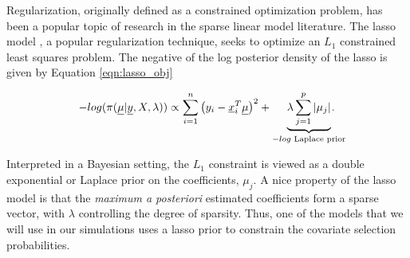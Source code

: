 		Regularization, originally defined as a constrained optimization problem, has been a popular topic of research in the sparse linear model literature. The lasso model \cite{tibshirani1996regression}, a popular regularization technique, seeks to optimize an $L_1$ constrained least squares problem. The negative of the log posterior density of the lasso is given by Equation \ref{eqn:lasso_obj}
		
		\begin{equation}\label{eqn:lasso_obj}
		-log(\pi(\vec{\mu} \vert \vec{y}, X, \lambda )) \propto \sum_{i=1}^n\left(y_i - \vec{x}_i^T\vec{\mu}\right)^2 + \underbrace{\lambda \sum_{j=1}^p \vert \mu_j \vert}_{\text{$-log$ Laplace prior}}\hspace{-0.5cm}.
		\end{equation}
		
\noindent Interpreted in a Bayesian setting, the $L_1$ constraint is viewed as a double exponential or Laplace prior on the coefficients, $\mu_j$. A nice property of the lasso model is that the \emph{maximum a posteriori} estimated coefficients form a sparse vector, with $\lambda$ controlling the degree of sparsity. Thus, one of the models that we will use in our simulations uses a lasso prior to constrain the covariate selection probabilities. 

